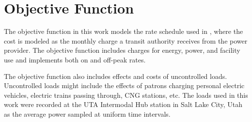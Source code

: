 \section{Objective Function}
The objective function in this work models the rate schedule used in \cite{noauthor_rocky_nodate}, where the cost is modeled as the monthly charge a transit authority receives from the power provider. The objective function includes charges for energy, power, and facility use and implements both on and off-peak rates.
\par The objective function also includes effects and costs of
uncontrolled loads. Uncontrolled loads might include the effects of
patrons charging personal electric vehicles, electric trains passing
through, CNG stations, etc. The loads used in this work were recorded
at the UTA Intermodal Hub station in Salt Lake City, Utah as the
average power sampled at uniform time intervals.
